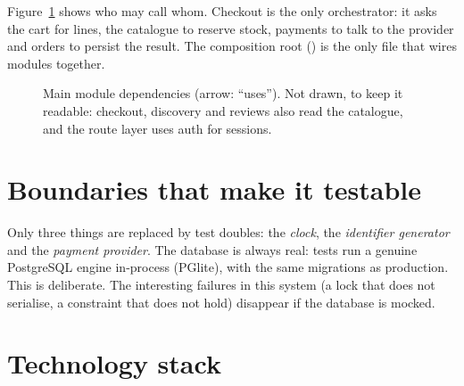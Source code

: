 Figure~\ref{fig:deps} shows who may call whom. Checkout is the only orchestrator: it asks the cart for lines, the catalogue to reserve stock, payments to talk to the provider and orders to persist the result. The composition root () is the only file that wires modules together.

\begin{figure}[H]
\centering
{}
\caption{Main module dependencies (arrow: ``uses''). Not drawn, to keep it readable: checkout, discovery and reviews also read the catalogue, and the route layer uses auth for sessions.}
\label{fig:deps}
\end{figure}

\section{Boundaries that make it testable}

Only three things are replaced by test doubles: the \emph{clock}, the \emph{identifier generator} and the \emph{payment provider}. The database is always real: tests run a genuine PostgreSQL engine in-process (PGlite), with the same migrations as production. This is deliberate. The interesting failures in this system (a lock that does not serialise, a constraint that does not hold) disappear if the database is mocked. \tagimpl{} \tagtest{}

\section{Technology stack}


